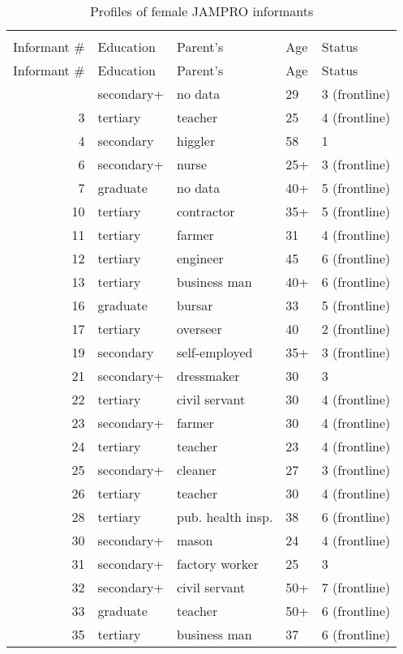 \begin{longtable}{rllll}
\caption{Profiles of female JAMPRO informants}\\
\lsptoprule
\multicolumn{5}{c}{Females}\\\cmidrule(lr){1-5}
Informant \# & Education & Parent's & Age & Status\\\midrule\endfirsthead
\midrule Informant \# & Education & Parent's & Age & Status\\\midrule\endhead
\lspbottomrule\endlastfoot
2 & secondary+ & no data & 29 & 3 (frontline)\\
3 & tertiary & teacher & 25 & 4 (frontline)\\
4 & secondary & higgler & 58 & 1 \\
6 & secondary+ & nurse & 25+ & 3 (frontline)\\
7 & graduate & no data & 40+ & 5 (frontline)\\
10 & tertiary & contractor & 35+ & 5 (frontline) \\
11 & tertiary & farmer & 31 & 4 (frontline)\\
12 & tertiary & engineer & 45 & 6 (frontline)\\
13 & tertiary & business man & 40+ & 6 (frontline) \\
16 & graduate & bursar & 33 & 5 (frontline)\\
17 & tertiary & overseer & 40 & 2 (frontline)\\
19 & secondary & self-employed & 35+ & 3 (frontline)\\
21 & secondary+ & dressmaker & 30 & 3 \\
22 & tertiary & civil servant & 30 & 4 (frontline)\\
23 & secondary+ & farmer & 30 & 4 (frontline)\\
24 & tertiary & teacher & 23 & 4 (frontline)\\
25 & secondary+ & cleaner & 27 & 3 (frontline)\\
26 & tertiary & teacher & 30 & 4 (frontline)\\
28 & tertiary & pub. health insp. & 38 & 6 (frontline)\\
30 & secondary+ & mason & 24 & 4 (frontline)\\
31 & secondary+ & factory worker & 25 & 3 \\
32 & secondary+ & civil servant & 50+ & 7 (frontline)\\
33 & graduate & teacher & 50+ & 6 (frontline)\\
35 & tertiary & business man & 37 & 6 (frontline)\\

\end{longtable}
